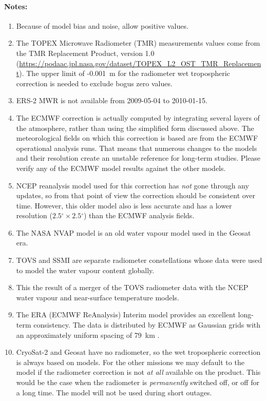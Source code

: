 \documentclass[a4paper,11pt,openany,natbib,nomargin]{thesis}
\makeatletter
\renewcommand\deg{\ensuremath{^\circ}}
\newcommand\var[1]{\url{#1}\index{variables!#1@\protect\url{#1}}}
\newenvironment{notes}[1][Notes:]{\FloatBarrier\paragraph{#1}\begin{enumerate}}{\end{enumerate}}
\makeatother
\begin{document}
\begin{notes}
\item Because of model bias and noise, allow positive values.\label{item:wet_tropo_rad_n1}
\item The TOPEX Microwave Radiometer (TMR) measurements values come from the TMR Replacement Product, version 1.0 (\url{https://podaac.jpl.nasa.gov/dataset/TOPEX_L2_OST_TMR_Replacement}). The upper limit of -0.001~m for the radiometer wet tropospheric correction is needed to exclude bogus zero values.\label{item:wet_tropo_rad_tp}
\item ERS-2 MWR is not available from 2009-05-04 to 2010-01-15.\label{item:wet_tropo_rad_e2}
\item The ECMWF correction is actually computed by integrating several layers of the atmosphere, rather than using the simplified form discussed above. The meteorological fields on which this correction is based are from the ECMWF operational analysis runs. That means that numerous changes to the models and their resolution create an unstable reference for long-term studies. Please verify any of the ECMWF model results against the other models.\label{item:wet_tropo_ecmwf}
\item NCEP reanalysis model used for this correction has \emph{not} gone through any updates, so from that point of view the correction should be consistent over time. However, this older model also is less accurate and has a lower resolution ($2.5\deg\times2.5\deg$) than the ECMWF analysis fields.\label{item:wet_tropo_ncep}
\item The NASA NVAP model is an old water vapour model used in the Geosat era.\label{item:wet_tropo_nvap}
\item TOVS and SSMI are separate radiometer constellations whose data were used to model the water vapour content globally.\label{item:wet_tropo_tovs_ssmi}
\item This the result of a merger of the TOVS radiometer data with the NCEP water vapour and near-surface temperature models.\label{item:wet_tropo_tovs_ncep}
\item The ERA (ECMWF ReAnalysis) Interim model provides an excellent long-term consistency. The data is distributed by ECMWF as Gaussian grids with an approximately uniform spacing of 79~km \citep{berrisford2011}.\label{item:wet_tropo_era}
\item CryoSat-2 and Geosat have no radiometer, so the wet tropospheric correction is always based on models. For the other missions we may default to the model if the radiometer correction is not \emph{at all} available on the product. This would be the case when the radiometer is \emph{permanently} switched off, or off for a long time. The model will not be used during short outages.\label{item:wet_tropo}
\end{notes}
\end{document}
